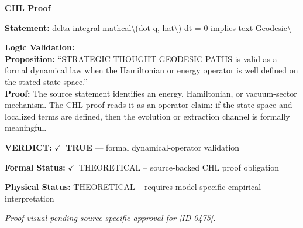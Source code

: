 \vspace{0.45em}
\noindent\textbf{CHL Proof}\par
\textbf{Statement:} delta integral mathcal\textbackslash{}(dot q, hat\textbackslash{}) dt = 0 implies text Geodesic\textbackslash{}

\textbf{Logic Validation:}\\
\textbf{Proposition:} ``STRATEGIC THOUGHT GEODESIC PATHS is valid as a formal dynamical law when the Hamiltonian
or energy operator is well defined on the stated state space.''\\
\textbf{Proof:} The source statement identifies an energy, Hamiltonian, or vacuum-sector mechanism. The
CHL proof reads it as an operator claim: if the state space and localized terms are
defined, then the evolution or extraction channel is formally meaningful.

\textbf{VERDICT:} \ensuremath{\checkmark}\ \textbf{TRUE} --- formal dynamical-operator validation

\textbf{Formal Status:} \ensuremath{\checkmark}\ THEORETICAL -- source-backed CHL proof obligation

\textbf{Physical Status:} THEORETICAL -- requires model-specific empirical interpretation
\par\vspace{0.45em}
\par
\vfill
\begingroup\footnotesize\itshape
Proof visual pending source-specific approval for [ID 0475].
\par\endgroup
\vfill
\endgroup
\endgroup
